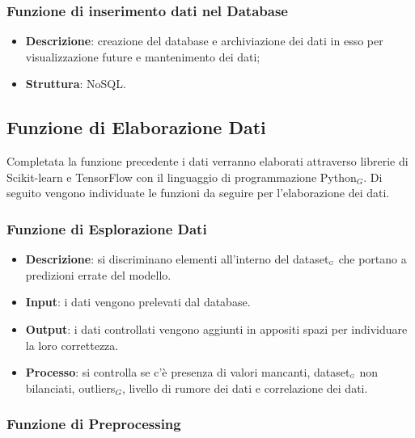 \subsubsection{Funzione di inserimento dati nel Database}\label{DescrizioneGeneraleFunzionalitàDelProdottoFunzioneDiAcquisizioneDiDatiFunzioneDiInserimentoDatiNelDatabase}

\begin{itemize}
	\item \textbf{Descrizione}: creazione del database e archiviazione dei dati in esso per visualizzazione future e mantenimento dei dati;
	\item \textbf{Struttura}: NoSQL.
\end{itemize}


\subsection{Funzione di Elaborazione Dati}\label{DescrizioneGeneraleFunzionalitàDelProdottoFunzioneDiElaborazioneDati}
Completata la funzione precedente i dati verranno elaborati attraverso librerie di Scikit-learn e TensorFlow con il linguaggio di programmazione Python$_G$.
Di seguito vengono individuate le funzioni da seguire per l'elaborazione dei dati.

\subsubsection{Funzione di Esplorazione Dati}\label{DescrizioneGeneraleFunzionalitàDelProdottoFunzioneDiElaborazioneDatiFunzioneDiEsplorazioneDati}

\begin{itemize}
	\item \textbf{Descrizione}: si discriminano elementi all'interno del dataset$_{\scaleto{G}{3pt}}$ che portano a predizioni errate del modello.
	\item \textbf{Input}: i dati vengono prelevati dal database.
	\item \textbf{Output}: i dati controllati vengono aggiunti in appositi spazi per individuare la loro correttezza.
	\item \textbf{Processo}: si controlla se c'è presenza di valori mancanti, dataset$_{\scaleto{G}{3pt}}$ non bilanciati, outliers$_G$, livello di rumore dei dati e correlazione dei dati.
\end{itemize}

\subsubsection{Funzione di Preprocessing}\label{DescrizioneGeneraleFunzionalitàDelProdottoFunzioneDiElaborazioneDatiFunzioneDiPreprocessing}

